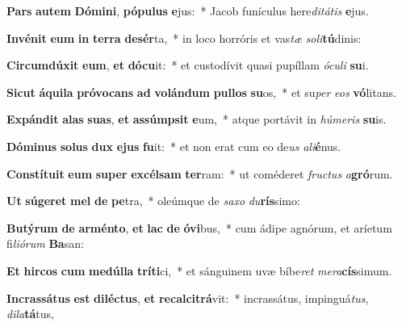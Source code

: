 \item \textbf{Pars} \textbf{au}\textbf{tem} \textbf{Dó}\textbf{mi}\textbf{ni}, \textbf{pó}\textbf{pu}\textbf{lus} \textbf{e}jus:~* Jacob funículus here\textit{di}\textit{tá}\textit{tis} \textbf{e}jus.
\item \textbf{In}\textbf{vé}\textbf{nit} \textbf{e}\textbf{um} \textbf{in} \textbf{ter}\textbf{ra} \textbf{de}\textbf{sér}ta,~* in loco horróris et vas\textit{tæ} \textit{so}\textit{li}\textbf{tú}dinis:
\item \textbf{Cir}\textbf{cum}\textbf{dú}\textbf{xit} \textbf{e}\textbf{um}, \textbf{et} \textbf{dó}\textbf{cu}it:~* et custodívit quasi pupíllam \textit{ó}\textit{cu}\textit{li} \textbf{su}i.
\item \textbf{Sic}\textbf{ut} \textbf{á}\textbf{qui}\textbf{la} \textbf{pró}\textbf{vo}\textbf{cans} \textbf{ad} \textbf{vo}\textbf{lán}\textbf{dum} \textbf{pul}\textbf{los} \textbf{su}os,~* et su\textit{per} \textit{e}\textit{os} \textbf{vó}litans.
\item \textbf{Ex}\textbf{pán}\textbf{dit} \textbf{a}\textbf{las} \textbf{su}\textbf{as}, \textbf{et} \textbf{as}\textbf{súmp}\textbf{sit} \textbf{e}um,~* atque portávit in \textit{hú}\textit{me}\textit{ris} \textbf{su}is.
\item \textbf{Dó}\textbf{mi}\textbf{nus} \textbf{so}\textbf{lus} \textbf{dux} \textbf{e}\textbf{jus} \textbf{fu}it:~* et non erat cum eo de\textit{us} \textit{a}\textit{li}\textbf{é}nus.
\item \textbf{Con}\textbf{stí}\textbf{tu}\textbf{it} \textbf{e}\textbf{um} \textbf{su}\textbf{per} \textbf{ex}\textbf{cél}\textbf{sam} \textbf{ter}ram:~* ut coméderet \textit{fruc}\textit{tus} \textit{a}\textbf{gró}rum.
\item \textbf{Ut} \textbf{sú}\textbf{ge}\textbf{ret} \textbf{mel} \textbf{de} \textbf{pe}tra,~* oleúmque de \textit{sa}\textit{xo} \textit{du}\textbf{rís}simo:
\item \textbf{Bu}\textbf{tý}\textbf{rum} \textbf{de} \textbf{ar}\textbf{mén}\textbf{to}, \textbf{et} \textbf{lac} \textbf{de} \textbf{ó}\textbf{vi}bus,~* cum ádipe agnórum, et aríetum fi\textit{li}\textit{ó}\textit{rum} \textbf{Ba}san:
\item \textbf{Et} \textbf{hir}\textbf{cos} \textbf{cum} \textbf{me}\textbf{dúl}\textbf{la} \textbf{trí}\textbf{ti}ci,~* et sánguinem uvæ bíbe\textit{ret} \textit{me}\textit{ra}\textbf{cís}simum.
\item \textbf{In}\textbf{cras}\textbf{sá}\textbf{tus} \textbf{est} \textbf{di}\textbf{léc}\textbf{tus}, \textbf{et} \textbf{re}\textbf{cal}\textbf{ci}\textbf{trá}vit:~* incrassátus, impinguá\textit{tus}, \textit{di}\textit{la}\textbf{tá}tus,

